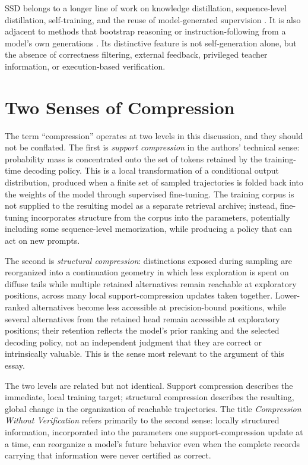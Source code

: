 \documentclass[11pt]{article}
\begin{document}
SSD belongs to a longer line of work on knowledge distillation, sequence-level distillation, self-training, and the reuse of model-generated supervision \cite{hinton2015distillation,kim2016sequence,furlanello2018bornagain,he2020selftraining}. It is also adjacent to methods that bootstrap reasoning or instruction-following from a model's own generations \cite{zelikman2022star,huang2023selfimprove}. Its distinctive feature is not self-generation alone, but the absence of correctness filtering, external feedback, privileged teacher information, or execution-based verification.

\section{Two Senses of Compression}

The term ``compression'' operates at two levels in this discussion, and they should not be conflated. The first is \emph{support compression} in the authors' technical sense: probability mass is concentrated onto the set of tokens retained by the training-time decoding policy. This is a local transformation of a conditional output distribution, produced when a finite set of sampled trajectories is folded back into the weights of the model through supervised fine-tuning. The training corpus is not supplied to the resulting model as a separate retrieval archive; instead, fine-tuning incorporates structure from the corpus into the parameters, potentially including some sequence-level memorization, while producing a policy that can act on new prompts.

The second is \emph{structural compression}: distinctions exposed during sampling are reorganized into a continuation geometry in which less exploration is spent on diffuse tails while multiple retained alternatives remain reachable at exploratory positions, across many local support-compression updates taken together. Lower-ranked alternatives become less accessible at precision-bound positions, while several alternatives from the retained head remain accessible at exploratory positions; their retention reflects the model's prior ranking and the selected decoding policy, not an independent judgment that they are correct or intrinsically valuable. This is the sense most relevant to the argument of this essay.

The two levels are related but not identical. Support compression describes the immediate, local training target; structural compression describes the resulting, global change in the organization of reachable trajectories. The title \emph{Compression Without Verification} refers primarily to the second sense: locally structured information, incorporated into the parameters one support-compression update at a time, can reorganize a model's future behavior even when the complete records carrying that information were never certified as correct.
\end{document}
